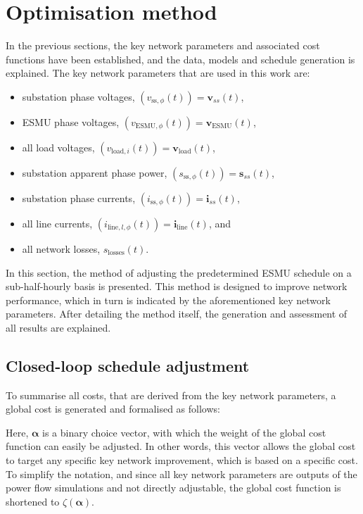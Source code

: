 \section{Optimisation method}
\label{ch1:sec:closed-loop-optimisation-method}

In the previous sections, the key network parameters and associated cost functions have been established, and the data, models and schedule generation is explained.
The key network parameters that are used in this work are:

\begin{itemize}
	\item substation phase voltages, $(v_{\text{ss},\phi}(t)) = \textbf{v}_{ss}(t)$,
	\item ESMU phase voltages, $(v_{\text{ESMU},\phi}(t)) = \textbf{v}_\text{ESMU}(t)$,
	\item all load voltages, $(v_{\text{load},i}(t)) = \textbf{v}_\text{load}(t)$,
	\item substation apparent phase power, $(s_{\text{ss},\phi}(t)) = \textbf{s}_{ss}(t)$,
	\item substation phase currents, $(i_{\text{ss},\phi}(t)) = \textbf{i}_{ss}(t)$,
	\item all line currents, $(i_{\text{line},l,\phi}(t)) = \textbf{i}_\text{line}(t)$, and
	\item all network losses, $s_\text{losses}(t)$.
\end{itemize}

In this section, the method of adjusting the predetermined ESMU schedule on a sub-half-hourly basis is presented.
This method is designed to improve network performance, which in turn is indicated by the aforementioned key network parameters.
After detailing the method itself, the generation and assessment of all results are explained. 

\subsection{Closed-loop schedule adjustment}

To summarise all costs, that are derived from the key network parameters, a global cost is generated and formalised as follows:



Here, $\boldsymbol{\alpha}$ is a binary choice vector, with which the weight of the global cost function can easily be adjusted.
In other words, this vector allows the global cost to target any specific key network improvement, which is based on a specific cost.
To simplify the notation, and since all key network parameters are outputs of the power flow simulations and not directly adjustable, the global cost function is shortened to $\zeta(\boldsymbol{\alpha})$.

